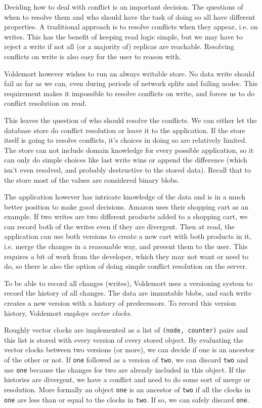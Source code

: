 Deciding how to deal with conflict is an important decision.
The questions of when to resolve them and who should have the task of doing so all have different properties.
A traditional approach is to resolve conflicts when they appear, i.e. on writes. 
This has the benefit of keeping read logic simple, but we may have to reject a write if not all (or a majority of) replicas are reachable. Resolving conflicts on write is also easy for the user to reason with.

Voldemort however wishes to run an always writable store. No data write should fail as far as we can, even during periods of network splits and failing nodes.
This requirement makes it impossible to resolve conflicts on write, and forces us to do conflict resolution on read.

This leaves the question of who should resolve the conflicts. We can either let the database store do conflict resolution or leave it to the application.
If the store itself is going to resolve conflicts, it's choices in doing so are relatively limited.
The store can not include domain knowledge for every possible application, so it can only do simple choices like last write wins or append the difference (which isn't even resolved, and probably destructive to the stored data). Recall that to the store most of the values are considered binary blobs.

The application however has intricate knowledge of the data and is in a much better position to make good decisions. 
Amazon\cite{dynamo} uses their shopping cart as an example. If two writes are two different products added to a shopping cart, we can record both of the writes even if they are divergent.
Then at read, the application can use both versions to create a new cart with both products in it, i.e. merge the changes in a reasonable way, and present them to the user.
This requires a bit of work from the developer, which they may not want or need to do, so there is also the option of doing simple conflict resolution on the server.

To be able to record all changes (writes), Voldemort uses a versioning system to record the history of all changes. The data are immutable blobs, and each write creates a new version with a history of predecessors.
To record this version history, Voldemort employs \emph{vector clocks}.

Roughly vector clocks are implemented as a list of \texttt{(node, counter)} pairs and this list is stored with every version of every stored object.
By evaluating the vector clocks between two versions (or more), we can decide if one is an ancestor of the other or not. If \texttt{one} followed as a version of \texttt{two}, we can discard \texttt{two} and use \texttt{one} because the changes for two are already included in this object. 
If the histories are divergent, we have a conflict and need to do some sort of merge or resolution. More formally an object \texttt{one} is an ancestor of \texttt{two} if all the clocks in \texttt{one} are less than or equal to the clocks in \texttt{two}. 
If so, we can safely discard \texttt{one}.

